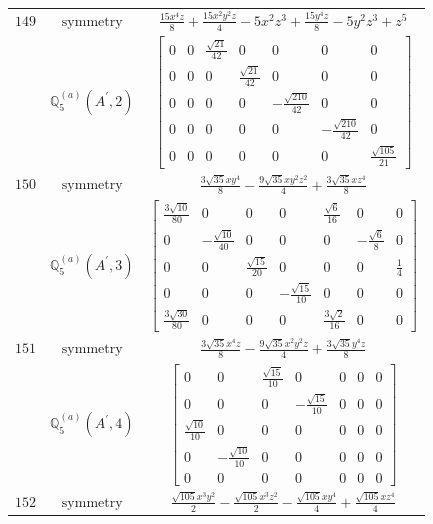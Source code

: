 \documentclass[fleqn,8pt,landscape]{jsarticle}
\begin{document}
\begin{longtable}{ccc}
$ 149 $ & $ \text{symmetry} $ & $ \frac{15 x^{4} z}{8} + \frac{15 x^{2} y^{2} z}{4} - 5 x^{2} z^{3} + \frac{15 y^{4} z}{8} - 5 y^{2} z^{3} + z^{5} $ \\
$  $ & $ \mathbb{Q}_{5}^{(a)}(A^{\prime},2) $ & $ \begin{bmatrix} 0 & 0 & \frac{\sqrt{21}}{42} & 0 & 0 & 0 & 0 \\ 0 & 0 & 0 & \frac{\sqrt{21}}{42} & 0 & 0 & 0 \\ 0 & 0 & 0 & 0 & - \frac{\sqrt{210}}{42} & 0 & 0 \\ 0 & 0 & 0 & 0 & 0 & - \frac{\sqrt{210}}{42} & 0 \\ 0 & 0 & 0 & 0 & 0 & 0 & \frac{\sqrt{105}}{21} \end{bmatrix} $ \\ \hline
$ 150 $ & $ \text{symmetry} $ & $ \frac{3 \sqrt{35} x y^{4}}{8} - \frac{9 \sqrt{35} x y^{2} z^{2}}{4} + \frac{3 \sqrt{35} x z^{4}}{8} $ \\
$  $ & $ \mathbb{Q}_{5}^{(a)}(A^{\prime},3) $ & $ \begin{bmatrix} \frac{3 \sqrt{10}}{80} & 0 & 0 & 0 & \frac{\sqrt{6}}{16} & 0 & 0 \\ 0 & - \frac{\sqrt{10}}{40} & 0 & 0 & 0 & - \frac{\sqrt{6}}{8} & 0 \\ 0 & 0 & \frac{\sqrt{15}}{20} & 0 & 0 & 0 & \frac{1}{4} \\ 0 & 0 & 0 & - \frac{\sqrt{15}}{10} & 0 & 0 & 0 \\ \frac{3 \sqrt{30}}{80} & 0 & 0 & 0 & \frac{3 \sqrt{2}}{16} & 0 & 0 \end{bmatrix} $ \\ \hline
$ 151 $ & $ \text{symmetry} $ & $ \frac{3 \sqrt{35} x^{4} z}{8} - \frac{9 \sqrt{35} x^{2} y^{2} z}{4} + \frac{3 \sqrt{35} y^{4} z}{8} $ \\
$  $ & $ \mathbb{Q}_{5}^{(a)}(A^{\prime},4) $ & $ \begin{bmatrix} 0 & 0 & \frac{\sqrt{15}}{10} & 0 & 0 & 0 & 0 \\ 0 & 0 & 0 & - \frac{\sqrt{15}}{10} & 0 & 0 & 0 \\ \frac{\sqrt{10}}{10} & 0 & 0 & 0 & 0 & 0 & 0 \\ 0 & - \frac{\sqrt{10}}{10} & 0 & 0 & 0 & 0 & 0 \\ 0 & 0 & 0 & 0 & 0 & 0 & 0 \end{bmatrix} $ \\ \hline
$ 152 $ & $ \text{symmetry} $ & $ \frac{\sqrt{105} x^{3} y^{2}}{2} - \frac{\sqrt{105} x^{3} z^{2}}{2} - \frac{\sqrt{105} x y^{4}}{4} + \frac{\sqrt{105} x z^{4}}{4} $ \\

\end{longtable}
\end{document}
